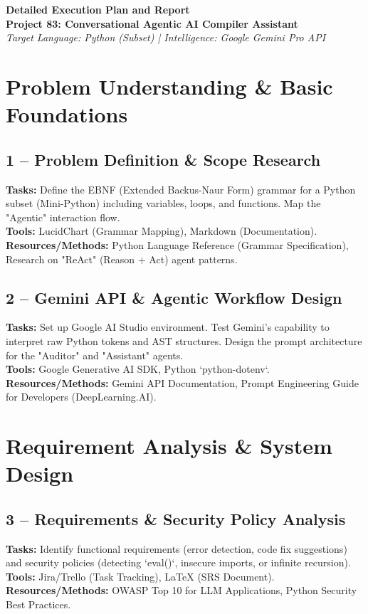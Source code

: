 \documentclass[a4paper,11pt]{article}
\newcommand{\weekdetail}[3]{
    \textbf{Tasks:} #1 \\
    \textbf{Tools:} #2 \\
    \textbf{Resources/Methods:} #3 \\
}
\begin{document}
\begin{center}
    {\huge \textbf{Detailed Execution Plan and Report}} \\
    \vspace{2mm}
    {\large \textbf{Project 83: Conversational Agentic AI Compiler Assistant}} \\
    \vspace{2mm}
    \textit{Target Language: Python (Subset) | Intelligence: Google Gemini Pro API}
\end{center}

\section{Problem Understanding \& Basic Foundations}

\subsection{1 -- Problem Definition \& Scope Research}
\weekdetail{
    Define the EBNF (Extended Backus-Naur Form) grammar for a Python subset (Mini-Python) including variables, loops, and functions. Map the "Agentic" interaction flow.
}{
    LucidChart (Grammar Mapping), Markdown (Documentation).
}{
    Python Language Reference (Grammar Specification), Research on "ReAct" (Reason + Act) agent patterns.
}

\subsection{2 -- Gemini API \& Agentic Workflow Design}
\weekdetail{
    Set up Google AI Studio environment. Test Gemini's capability to interpret raw Python tokens and AST structures. Design the prompt architecture for the "Auditor" and "Assistant" agents.
}{
    Google Generative AI SDK, Python `python-dotenv`.
}{
    Gemini API Documentation, Prompt Engineering Guide for Developers (DeepLearning.AI).
}

\section{Requirement Analysis \& System Design}

\subsection{3 -- Requirements \& Security Policy Analysis}
\weekdetail{
    Identify functional requirements (error detection, code fix suggestions) and security policies (detecting `eval()`, insecure imports, or infinite recursion).
}{
    Jira/Trello (Task Tracking), LaTeX (SRS Document).
}{
    OWASP Top 10 for LLM Applications, Python Security Best Practices.
}
\end{document}

